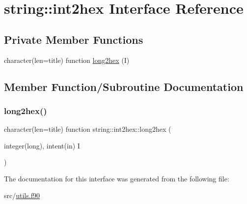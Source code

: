 \hypertarget{interfacestring_1_1int2hex}{}\section{string\+:\+:int2hex Interface Reference}
\label{interfacestring_1_1int2hex}
\subsection*{Private Member Functions}
\begin{DoxyCompactItemize}
\item 
character(len=title) function \hyperlink{interfacestring_1_1int2hex_a326630b7a8f58f61d878d26307864727}{long2hex} (I)
\end{DoxyCompactItemize}


\subsection{Member Function/\+Subroutine Documentation}
\mbox{\label{interfacestring_1_1int2hex_a326630b7a8f58f61d878d26307864727}} 
\subsubsection{\texorpdfstring{long2hex()}{long2hex()}}
{\footnotesize\ttfamily character(len=title) function string\+::int2hex\+::long2hex (\begin{DoxyParamCaption}\item[{integer(long), intent(in)}]{I }\end{DoxyParamCaption})\hspace{0.3cm}{\ttfamily [private]}}



The documentation for this interface was generated from the following file\+:\begin{DoxyCompactItemize}
\item 
src/\hyperlink{utils_8f90}{utils.\+f90}\end{DoxyCompactItemize}
